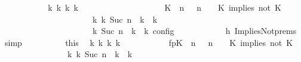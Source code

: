 \begin{isabellebody}
\ \ \ \ \ \ \ \ \isamarkupfalse%
\ \isamarkupfalse%
\ {\isacartoucheopen}{\isasymexists}{\isasymGamma}\isactrlsub k\ {\isasymPsi}\isactrlsub k\ {\isasymPhi}\isactrlsub k\ k{\isachardot}\isanewline
\ \ \ \ \ \ \ \ \ \ \ \ \ \ \ \ \ \ \ \ {\isacharparenleft}{\isacharparenleft}{\isacharparenleft}{\isacharparenleft}K\ {\isasymnot}{\isasymUp}\ n{\isacharparenright}\ {\isacharhash}\ {\isasymGamma}{\isacharparenright}{\isacharcomma}\ n\ {\isasymturnstile}\ {\isasymPsi}\ {\isasymtriangleright}\ {\isacharparenleft}{\isacharparenleft}K\ implies\ not\ K\ {\isacharhash}\ {\isasymPhi}{\isacharparenright}{\isacharparenright}\isanewline
\ \ \ \ \ \ \ \ \ \ \ \ \ \ \ \ \ \ \ \ \ \ {\isasymhookrightarrow}\isactrlbsup k\isactrlesup \ {\isacharparenleft}{\isasymGamma}\isactrlsub k{\isacharcomma}\ Suc\ n\ {\isasymturnstile}\ {\isasymPsi}\isactrlsub k\ {\isasymtriangleright}\ {\isasymPhi}\isactrlsub k{\isacharparenright}{\isacharparenright}\isanewline
\ \ \ \ \ \ \ \ \ \ \ \ \ \ \ \ \ \ {\isasymand}\ {\isasymrho}\ {\isasymin}\ {\isasymlbrakk}\ {\isasymGamma}\isactrlsub k{\isacharcomma}\ Suc\ n\ {\isasymturnstile}\ {\isasymPsi}\isactrlsub k\ {\isasymtriangleright}\ {\isasymPhi}\isactrlsub k\ {\isasymrbrakk}\isactrlsub c\isactrlsub o\isactrlsub n\isactrlsub f\isactrlsub i\isactrlsub g{\isacartoucheclose}\isanewline
\ \ \ \ \ \ \ \ \ \ \isamarkupfalse%
\ h{}\ ImpliesNot{\isachardot}prems\ \isamarkupfalse%
\ simp\isanewline
\ \ \ \ \ \ \ \ \isamarkupfalse%
\ this\ \isamarkupfalse%
\ {\isasymGamma}\isactrlsub k\ {\isasymPsi}\isactrlsub k\ {\isasymPhi}\isactrlsub k\ k\ \isanewline
\ \ \ \ \ \ \ \ \ \ fp{\isacharcolon}{\isacartoucheopen}{\isacharparenleft}{\isacharparenleft}{\isacharparenleft}{\isacharparenleft}K\ {\isasymnot}{\isasymUp}\ n{\isacharparenright}\ {\isacharhash}\ {\isasymGamma}{\isacharparenright}{\isacharcomma}\ n\ {\isasymturnstile}\ {\isasymPsi}\ {\isasymtriangleright}\ {\isacharparenleft}{\isacharparenleft}K\ implies\ not\ K\ {\isacharhash}\ {\isasymPhi}{\isacharparenright}{\isacharparenright}\isanewline
\ \ \ \ \ \ \ \ \ \ \ \ \ \ \ \ {\isasymhookrightarrow}\isactrlbsup k\isactrlesup \ {\isacharparenleft}{\isasymGamma}\isactrlsub k{\isacharcomma}\ Suc\ n\ {\isasymturnstile}\ {\isasymPsi}\isactrlsub k\ {\isasymtriangleright}\ {\isasymPhi}\isactrlsub k{\isacharparenright}{\isacharparenright}{\isacartoucheclose}\isanewline

\end{isabellebody}
